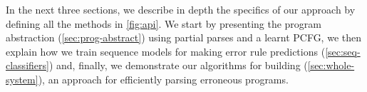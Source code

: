 In the next three sections, we describe in depth the specifics of our approach
by defining all the methods in \autoref{fig:api}. We start by presenting the
program abstraction (\autoref{sec:prog-abstract}) using partial parses and a
learnt PCFG, we then explain how we train sequence models for making error rule
predictions (\autoref{sec:seq-classifiers}) and, finally, we demonstrate our
algorithms for building \toolname (\autoref{sec:whole-system}), an approach for
efficiently parsing erroneous programs.
